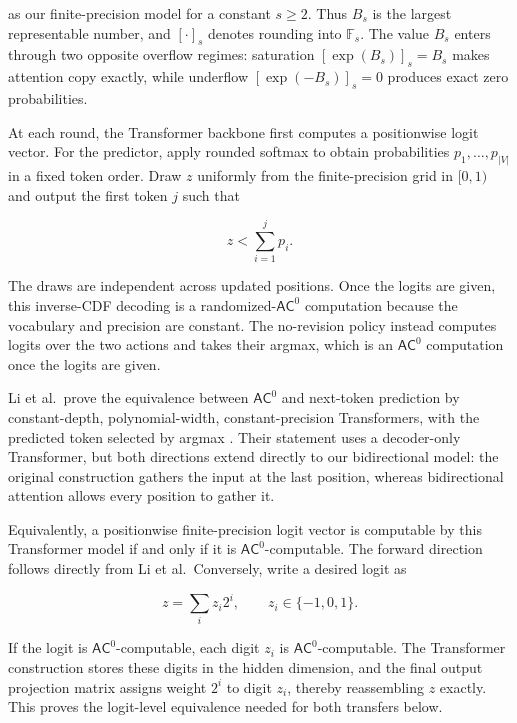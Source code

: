 \documentclass[10pt]{article}
\theoremstyle{definition}
\newcommand{\AC}{\mathsf{AC}}
\begin{document}
as our finite-precision model for a constant $s\ge2$.  Thus $B_s$ is the
largest representable number, and $[\cdot]_s$ denotes rounding into
$\mathbb F_s$.  The value $B_s$ enters through two opposite overflow regimes:
saturation $[\exp(B_s)]_s=B_s$ makes attention copy exactly, while underflow
$[\exp(-B_s)]_s=0$ produces exact zero probabilities.

At each round, the Transformer backbone first computes a positionwise logit
vector.  For the predictor, apply rounded softmax to obtain probabilities
$p_1,\ldots,p_{|V|}$ in a fixed token order.  Draw $z$ uniformly from the
finite-precision grid in $[0,1)$ and output the first token $j$ such that

\begin{equation}
 z<\sum_{i=1}^{j}p_i.
\end{equation}

The draws are independent across updated positions.  Once the logits are
given, this inverse-CDF decoding is a randomized-$\AC^0$ computation because
the vocabulary and precision are constant.  The no-revision policy instead
computes logits over the two actions and takes their argmax, which is an
$\AC^0$ computation once the logits are given.

Li et al.\ prove the equivalence between $\AC^0$ and next-token prediction by
constant-depth, polynomial-width, constant-precision Transformers, with the
predicted token selected by argmax \cite{li2024cot}.  Their statement uses a
decoder-only Transformer, but both directions extend directly to our
bidirectional model: the original construction gathers the input at the last
position, whereas bidirectional attention allows every position to gather it.

Equivalently, a positionwise finite-precision logit vector is computable by
this Transformer model if and only if it is $\AC^0$-computable.  The forward
direction follows directly from Li et al.\ Conversely, write a desired logit as

\begin{equation}
 z=\sum_i z_i2^i,
 \qquad z_i\in\{-1,0,1\}.
\end{equation}

If the logit is $\AC^0$-computable, each digit $z_i$ is $\AC^0$-computable.
The Transformer construction stores these digits in the hidden dimension,
and the final output projection matrix assigns weight $2^i$ to digit $z_i$,
thereby reassembling $z$ exactly.  This proves the logit-level equivalence
needed for both transfers below.
\end{document}
